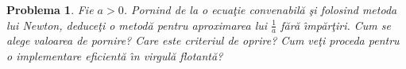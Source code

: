 \documentclass[landscape,twocolumn]{article}%
\newtheorem{problem}[theorem]{Problema}
\begin{document}
\begin{problem}
Fie $a>0$. Pornind de la o ecua\c{t}ie convenabil\u{a} \c{s}i folosind metoda
lui Newton, deduce\c{t}i o metod\u{a} pentru aproximarea lui $\frac{1}{a}$
f\u{a}r\u{a} \^{\i}mp\u{a}r\c{t}iri. Cum se alege valoarea de pornire? Care
este criteriul de oprire? Cum ve\c{t}i proceda pentru o implementare
eficient\u{a} \^{\i}n virgul\u{a} flotant\u{a}?
\end{problem}
\end{document}
